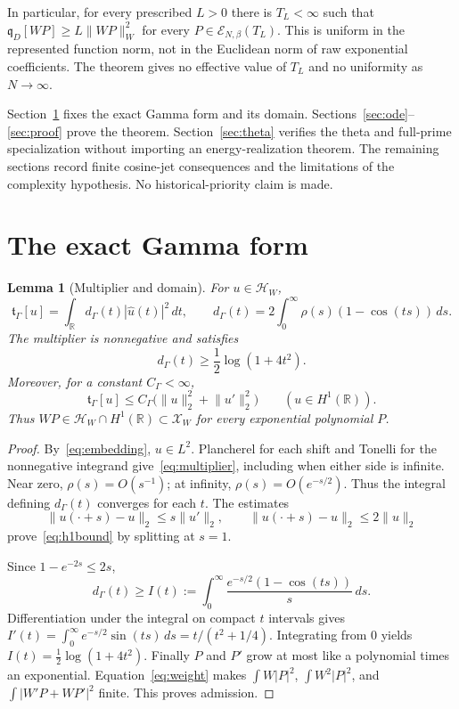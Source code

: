 \documentclass[11pt]{article}
\newtheorem{lemma}[theorem]{Lemma}
\theoremstyle{definition}
\theoremstyle{remark}
\newcommand{\R}{\mathbb R}
\newcommand{\HH}{\mathcal H_W}
\newcommand{\XX}{\mathcal X_W}
\newcommand{\EE}{\mathcal E_{N,\beta}}
\newcommand{\tg}{\mathfrak t_\Gamma}
\newcommand{\qD}{\mathfrak q_D}
\newcommand{\norm}[1]{\lVert #1\rVert}
\begin{document}
In particular, for every prescribed $L>0$ there is $T_L<\infty$ such that
$\qD[WP]\ge L\norm{WP}_W^2$ for every $P\in\EE(T_L)$.
This is uniform in the represented function norm, not in the Euclidean
norm of raw exponential coefficients. The theorem gives no effective
value of $T_L$ and no uniformity as $N\to\infty$.

Section~\ref{sec:gamma} fixes the exact Gamma form and its domain.
Sections~\ref{sec:ode}--\ref{sec:proof} prove the theorem.
Section~\ref{sec:theta} verifies the theta and full-prime specialization
without importing an energy-realization theorem. The remaining sections
record finite cosine-jet consequences and the limitations of the
complexity hypothesis. No historical-priority claim is made.

\section{The exact Gamma form}\label{sec:gamma}

\begin{lemma}[Multiplier and domain]\label{lem:gamma}
For $u\in\HH$,
\begin{equation}\label{eq:multiplier}
 \tg[u]=\int_\R d_\Gamma(t)|\widehat u(t)|^2\,dt,
 \qquad
 d_\Gamma(t)=2\int_0^\infty\rho(s)(1-\cos(ts))\,ds.
\end{equation}
The multiplier is nonnegative and satisfies
\begin{equation}\label{eq:logbound}
 d_\Gamma(t)\ge\frac12\log(1+4t^2).
\end{equation}
Moreover, for a constant $C_\Gamma<\infty$,
\begin{equation}\label{eq:h1bound}
 \tg[u]\le C_\Gamma\bigl(\norm u_2^2+\norm{u'}_2^2\bigr)
 \qquad(u\in H^1(\R)).
\end{equation}
Thus $WP\in\HH\cap H^1(\R)\subset\XX$ for every exponential polynomial
$P$.
\end{lemma}
\begin{proof}
By~\eqref{eq:embedding}, $u\in L^2$. Plancherel for each shift and Tonelli
for the nonnegative integrand give~\eqref{eq:multiplier}, including when
either side is infinite. Near zero, $\rho(s)=O(s^{-1})$; at infinity,
$\rho(s)=O(e^{-s/2})$. Thus the integral defining $d_\Gamma(t)$ converges
for each $t$. The estimates
\[
 \norm{u(\cdot+s)-u}_2\le s\norm{u'}_2,
 \qquad \norm{u(\cdot+s)-u}_2\le2\norm u_2
\]
prove~\eqref{eq:h1bound} by splitting at $s=1$.

Since $1-e^{-2s}\le2s$,
\[
 d_\Gamma(t)\ge I(t):=\int_0^\infty
 \frac{e^{-s/2}(1-\cos(ts))}{s}\,ds.
\]
Differentiation under the integral on compact $t$ intervals gives
$I'(t)=\int_0^\infty e^{-s/2}\sin(ts)\,ds=t/(t^2+1/4)$.
Integrating from $0$ yields $I(t)=\tfrac12\log(1+4t^2)$.
Finally $P$ and $P'$ grow at most like a polynomial times an exponential.
Equation~\eqref{eq:weight} makes
$\int W|P|^2$, $\int W^2|P|^2$, and
$\int |W'P+WP'|^2$ finite. This proves admission.
\end{proof}
\end{document}
